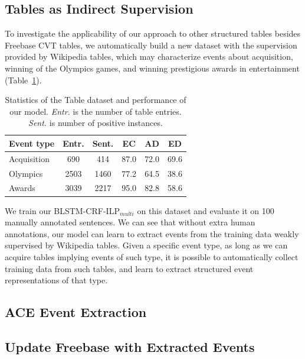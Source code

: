 \subsection{Tables as Indirect Supervision}
To investigate the applicability of our approach to other structured tables besides Freebase CVT tables, %
we automatically build a new dataset with the supervision provided by Wikipedia tables, which may characterize events about acquisition, winning of the Olympics games, and winning prestigious awards in entertainment (Table~\ref{tab:6}). 

\begin{table}[h]
\small
\centering
\begin{tabular}{|l|c|c|c|c|c|} \hline
	Event type & Entr. & Sent. & EC & AD & ED \\ \hline
	Acquisition & 690 & 414 & 87.0 & 72.0 & 69.6 \\ \hline
	Olympics & 2503 & 1460 & 77.2 & 64.5 & 38.6 \\ \hline
	Awards & 3039 & 2217 & 95.0 & 82.8 & 58.6 \\ \hline
\end{tabular}
\caption{Statistics of the Table dataset and performance of our model. \textit{Entr.} is the number of table entries. \textit{Sent.} is number of positive instances.\label{tab:6}}
\end{table}

We train our BLSTM-CRF-ILP$_{multi}$ on this dataset and evaluate it on 100 manually annotated sentences.
We can see that without extra human annotations, %
our model can learn to extract events from the training data weakly supervised by Wikipedia tables. Given a specific event type, as long as we can acquire tables implying events of such type, it is possible to automatically collect training data from such tables, and learn to extract structured event representations of that type. %

\subsection{ACE Event Extraction}

\subsection{Update Freebase with Extracted Events}
